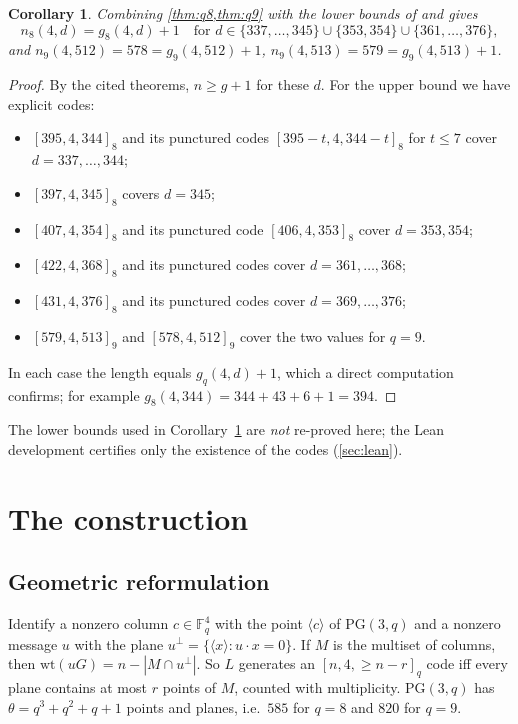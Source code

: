 \documentclass[11pt]{article}
\numberwithin{equation}{section}
\newtheorem{corollary}[theorem]{Corollary}
\theoremstyle{definition}
\theoremstyle{remark}
\newcommand{\F}{\mathbb F}
\newcommand{\PG}{\mathrm{PG}}
\newcommand{\wt}{\mathrm{wt}}
\begin{document}
\begin{corollary}\label{cor:exact}
Combining \cref{thm:q8,thm:q9} with the lower bounds of \cite[Thm.~1.1(4)]{KanazawaMaruta2011}
and \cite[Thm.~1.7(4)]{KOM2017} gives
\[
  n_8(4,d)=g_8(4,d)+1 \quad\text{for } d\in\{337,\dots,345\}\cup\{353,354\}\cup\{361,\dots,376\},
\]
and $n_9(4,512)=578=g_9(4,512)+1$, $n_9(4,513)=579=g_9(4,513)+1$.
\end{corollary}
\begin{proof}
By the cited theorems, $n\ge g+1$ for these $d$. For the upper bound we have explicit codes:
\begin{itemize}
\item $[395,4,344]_8$ and its punctured codes $[395-t,4,344-t]_8$ for $t\le 7$ cover $d=337,\dots,344$;
\item $[397,4,345]_8$ covers $d=345$;
\item $[407,4,354]_8$ and its punctured code $[406,4,353]_8$ cover $d=353,354$;
\item $[422,4,368]_8$ and its punctured codes cover $d=361,\dots,368$;
\item $[431,4,376]_8$ and its punctured codes cover $d=369,\dots,376$;
\item $[579,4,513]_9$ and $[578,4,512]_9$ cover the two values for $q=9$.
\end{itemize}
In each case the length equals $g_q(4,d)+1$, which a direct computation confirms; for example
$g_8(4,344)=344+43+6+1=394$.
\end{proof}

The lower bounds used in Corollary~\ref{cor:exact} are \emph{not} re-proved here; the Lean development
certifies only the existence of the codes (\cref{sec:lean}).

\section{The construction}\label{sec:construction}

\subsection{Geometric reformulation}
Identify a nonzero column $c\in\F_q^4$ with the point $\langle c\rangle$ of $\PG(3,q)$ and a nonzero
message $u$ with the plane $u^\perp=\{\langle x\rangle: u\cdot x=0\}$. If $M$ is the multiset of
columns, then $\wt(uG)=n-|M\cap u^\perp|$. So $L$ generates an $[n,4,\ge n-r]_q$ code iff every
plane contains at most $r$ points of $M$, counted with multiplicity. $\PG(3,q)$ has
$\theta=q^3+q^2+q+1$ points and planes, i.e.\ $585$ for $q=8$ and $820$ for $q=9$.
\end{document}
